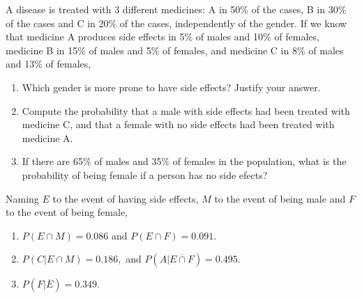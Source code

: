 {A disease is treated with 3 different medicines: A in 50\% of the cases, B in 30\% of the cases and C in 20\% of the cases, independently of the gender. 
If we know that medicine A produces side effects in 5\% of males and 10\% of females, medicine B
in 15\% of males and 5\% of females, and medicine C in 8\% of males and 13\% of females,
\begin{enumerate}
\item Which gender is more prone to have side effects? Justify your answer.
\item Compute the probability that a male with side effects had been treated with medicine C, and that a female with no side effects had been treated with medicine A.
\item If there are 65\% of males and 35\% of females in the population, what is the probability of being female if a person has no side efects?
\end{enumerate}
}
{Naming $E$ to the event of having side effects, $M$ to the event of being male and $F$ to the event of being female,
\begin{enumerate}
\item $P(E\cap M)=0.086$ and $P(E\cap F)=0.091$.
\item $P(C|E\cap M)=0.186,$ and $P(A|\overline{E\cap F})=0.495$.
\item $P(F|\overline E)= 0.349$.
\end{enumerate}
}
